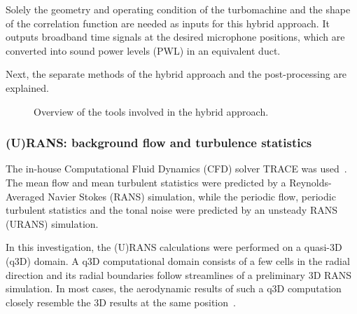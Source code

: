 Solely the geometry and operating condition of the turbomachine and the shape of the correlation function are needed as inputs for this hybrid approach. It outputs broadband time signals at the desired microphone positions, which are converted into sound power levels (PWL) in an equivalent duct.

Next, the separate methods of the hybrid approach and the post-processing are explained.
\begin{figure}

\caption{Overview of the tools involved in the hybrid approach.\label{fig:hybridAnsatz}}
\end{figure}

\subsubsection{(U)RANS: background flow and turbulence statistics}
\label{sec:RANS}
The in-house Computational Fluid Dynamics (CFD) solver TRACE was used~\cite{becker_recent_2010}. The mean flow and mean turbulent statistics were predicted by a Reynolds-Averaged Navier Stokes (RANS) simulation, while the periodic flow, periodic turbulent statistics and the tonal noise were predicted by an unsteady RANS (URANS) simulation. 

In this investigation, the (U)RANS calculations were performed on a quasi-3D (q3D) domain. A q3D computational domain consists of a few cells in the radial direction and its radial boundaries follow streamlines of a preliminary 3D RANS simulation. In most cases, the aerodynamic results of such a q3D computation closely resemble the 3D results at the same position~\cite{holewa_impact_2014}.
 

